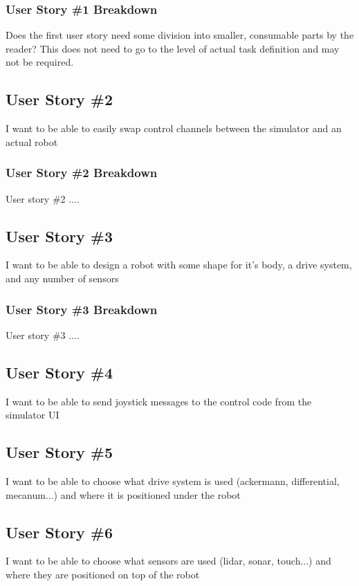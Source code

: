 \subsubsection{User Story \#1 Breakdown}
Does the first user story need some division into smaller, consumable parts by 
the reader?  This does not need to go to the level of actual task definition and 
may not be required. 

\subsection{User Story \#2} 
I want to be able to easily swap control channels between the simulator and an actual robot

\subsubsection{User Story \#2 Breakdown}
User story \#2  .... 

\subsection{User Story \#3} 
I want to be able to design a robot with some shape for it's body, a drive system, and any number of sensors

\subsubsection{User Story \#3 Breakdown}
User story \#3  .... 

\subsection{User Story \#4} 
I want to be able to send joystick messages to the control code from the simulator UI

\subsection{User Story \#5}
I want to be able to choose what drive system is used (ackermann, differential, mecanum...) and where it is positioned under the robot

\subsection{User Story \#6} 
I want to be able to choose what sensors are used (lidar, sonar, touch...) and where they are positioned on top of the robot

